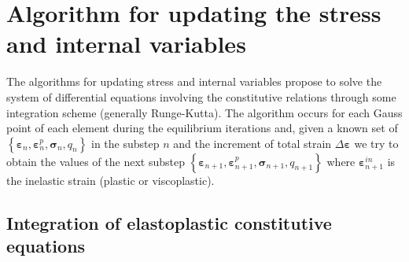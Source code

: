 \documentclass[Journal,letterpaper]{ascelike-new}
\newcommand{\Bll}{\boldsymbol B}
\newcommand{\Kll}{\boldsymbol K}
\newcommand{\Fl}{\boldsymbol{F}}
\newcommand{\Nll}{\boldsymbol N}
\newcommand{\Rl}{\boldsymbol{R}}
\newcommand{\ul}{\boldsymbol u}
\newcommand{\strain}{\boldsymbol{\varepsilon}}
\newcommand{\stress}{\boldsymbol{\sigma}}
\begin{document}
%

\section{Algorithm for updating the stress and internal variables}

The algorithms for updating stress and internal variables propose to solve the system of differential equations involving the constitutive relations through some integration scheme (generally Runge-Kutta). The algorithm occurs for each Gauss point of each element during the equilibrium iterations and, given a known set of $\left\{ \strain_n, \strain_n^p,\stress_n,q_n \right\}$ in the substep $n$ and the increment of total strain $\Delta \strain$ we try to obtain the values of the next substep $\left\{ \strain_{n+1}, \strain_{n+1}^p,\stress_{n+1},q_{n+1} \right\}$ where $\strain_{n+1}^{in}$ is the inelastic strain (plastic or viscoplastic).

\subsection{Integration of elastoplastic constitutive equations}
\end{document}
